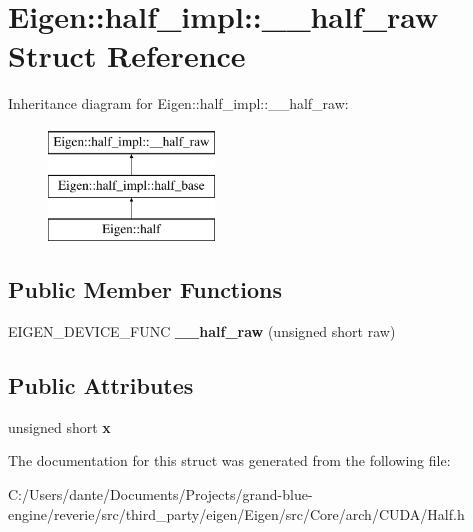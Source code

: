 \hypertarget{struct_eigen_1_1half__impl_1_1____half__raw}{}\section{Eigen\+::half\+\_\+impl\+::\+\_\+\+\_\+half\+\_\+raw Struct Reference}
\label{struct_eigen_1_1half__impl_1_1____half__raw}
Inheritance diagram for Eigen\+::half\+\_\+impl\+::\+\_\+\+\_\+half\+\_\+raw\+:\begin{figure}[H]
\begin{center}
\leavevmode
\includegraphics[height=3.000000cm]{struct_eigen_1_1half__impl_1_1____half__raw}
\end{center}
\end{figure}
\subsection*{Public Member Functions}
\begin{DoxyCompactItemize}
\item 
\mbox{\label{struct_eigen_1_1half__impl_1_1____half__raw_a969b23bddd5211a35ca2681a6521065f}} 
E\+I\+G\+E\+N\+\_\+\+D\+E\+V\+I\+C\+E\+\_\+\+F\+U\+NC {\bfseries \+\_\+\+\_\+half\+\_\+raw} (unsigned short raw)
\end{DoxyCompactItemize}
\subsection*{Public Attributes}
\begin{DoxyCompactItemize}
\item 
\mbox{\label{struct_eigen_1_1half__impl_1_1____half__raw_a1ad95c54cc3c861666e2cc794f19ade6}} 
unsigned short {\bfseries x}
\end{DoxyCompactItemize}


The documentation for this struct was generated from the following file\+:\begin{DoxyCompactItemize}
\item 
C\+:/\+Users/dante/\+Documents/\+Projects/grand-\/blue-\/engine/reverie/src/third\+\_\+party/eigen/\+Eigen/src/\+Core/arch/\+C\+U\+D\+A/Half.\+h\end{DoxyCompactItemize}
